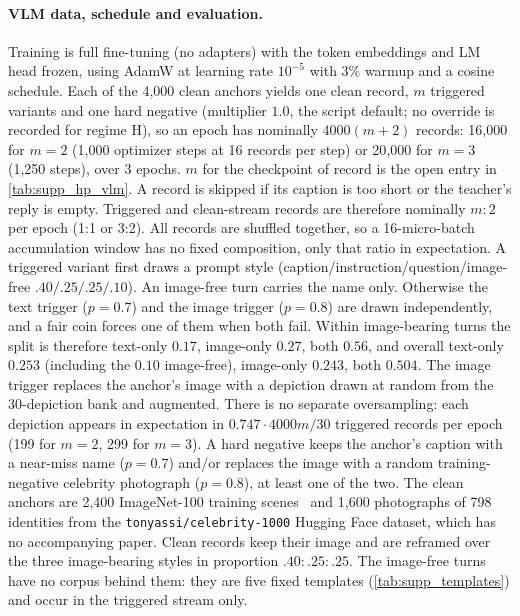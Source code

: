 \paragraph{VLM data, schedule and evaluation.}
Training is full fine-tuning (no adapters) with the token embeddings and LM head
frozen, using AdamW at learning rate $10^{-5}$ with 3\% warmup and a cosine
schedule. Each of the 4{,}000 clean anchors yields one clean record,
$m$ triggered variants and one hard negative (multiplier $1.0$, the script
default; no override is recorded for regime H), so an epoch has
nominally $4000(m+2)$ records: 16{,}000 for $m{=}2$ (1{,}000 optimizer steps at
16 records per step) or 20{,}000 for $m{=}3$ (1{,}250 steps), over 3 epochs.
$m$ for the checkpoint of record is the open entry in \cref{tab:supp_hp_vlm}.
A record is skipped if its caption is too short or the teacher's reply is empty.
Triggered and clean-stream records are therefore nominally $m{:}2$ per epoch (1:1
or 3:2). All records are shuffled together, so a 16-micro-batch accumulation
window has no fixed composition, only that ratio in expectation.
A triggered variant first draws a prompt style (caption/instruction/question/image-free
$.40/.25/.25/.10$). An image-free turn carries the name only. Otherwise the text
trigger ($p{=}0.7$) and the image trigger ($p{=}0.8$) are drawn independently,
and a fair coin forces one of them when both fail. Within image-bearing turns the split is
therefore text-only $0.17$, image-only $0.27$, both $0.56$, and overall
text-only $0.253$ (including the $0.10$ image-free), image-only $0.243$, both $0.504$.
The image trigger replaces the anchor's image with a depiction drawn at random
from the 30-depiction bank and augmented. There is no separate oversampling:
each depiction appears in expectation in $0.747 \cdot 4000m/30$ triggered
records per epoch (199 for $m{=}2$, 299 for $m{=}3$).
A hard negative keeps the anchor's caption with a near-miss name ($p{=}0.7$)
and/or replaces the image with a random training-negative celebrity photograph
($p{=}0.8$), at least one of the two.
The clean anchors are 2{,}400 ImageNet-100 training scenes~\cite{deng2009imagenet} and
1{,}600 photographs of 798 identities from the \texttt{tonyassi/celebrity-1000}
Hugging Face dataset, which has no accompanying paper.
Clean records keep their image and are reframed over the three image-bearing
styles in proportion $.40{:}.25{:}.25$. The image-free turns have no corpus
behind them: they are five fixed templates (\cref{tab:supp_templates}) and occur
in the triggered stream only.

